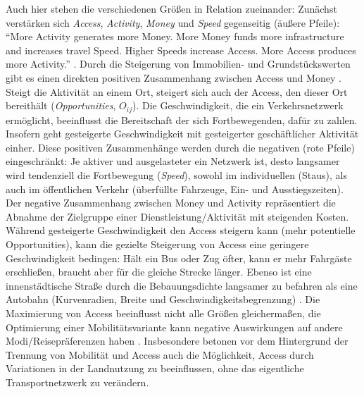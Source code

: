 \documentclass[11pt,pdftex,a4paper]{scrartcl}
\begin{document}
	Auch hier stehen die verschiedenen Größen in Relation zueinander: Zunächst verstärken sich \textit{Access}, \textit{Activity}, \textit{Money} und \textit{Speed} gegenseitig (äußere Pfeile): \enquote{More Activity generates more Money. More Money funds more infrastructure and increases travel Speed. Higher Speeds increase Access. More Access produces more Activity.} \parencite[18]{levinsonTransportAccessManual2020}. Durch die Steigerung von Immobilien- und Grundstückswerten gibt es einen direkten positiven Zusammenhang zwischen Access und Money \parencite[18]{levinsonTransportAccessManual2020}. Steigt die Aktivität an einem Ort, steigert sich auch der Access, den dieser Ort bereithält (\textit{Opportunities}, $O_{ij}$). Die Geschwindigkeit, die ein Verkehrsnetzwerk ermöglicht, beeinflusst die Bereitschaft der sich Fortbewegenden, dafür zu zahlen. Insofern geht gesteigerte Geschwindigkeit mit gesteigerter geschäftlicher Aktivität einher. Diese positiven Zusammenhänge werden durch die negativen (rote Pfeile) eingeschränkt: Je aktiver und ausgelasteter ein Netzwerk ist, desto langsamer wird tendenziell die Fortbewegung (\textit{Speed}), sowohl im individuellen (Staus), als auch im öffentlichen Verkehr (überfüllte Fahrzeuge, Ein- und Ausstiegszeiten). Der negative Zusammenhang zwischen Money und Activity repräsentiert die Abnahme der Zielgruppe einer Dienstleistung/Aktivität mit steigenden Kosten. Während gesteigerte Geschwindigkeit den Access steigern kann (mehr potentielle Opportunities), kann die gezielte Steigerung von Access eine geringere Geschwindigkeit bedingen: Hält ein Bus oder Zug öfter, kann er mehr Fahrgäste erschließen, braucht aber für die gleiche Strecke länger. Ebenso ist eine innenstädtische Straße durch die Bebauungsdichte langsamer zu befahren als eine Autobahn (Kurvenradien, Breite und Geschwindigkeitsbegrenzung) \parencite[19]{levinsonTransportAccessManual2020}. Die Maximierung von Access beeinflusst nicht alle Größen gleichermaßen, die Optimierung einer Mobilitätsvariante kann negative Auswirkungen auf andere Modi/Reisepräferenzen haben \parencite[vgl.][18f, 22, 25]{levinsonTransportAccessManual2020}. Insbesondere betonen \citeauthor{levinsonTransportAccessManual2020} vor dem Hintergrund der Trennung von Mobilität und Access auch die Möglichkeit, Access durch Variationen in der Landnutzung zu beeinflussen, ohne das eigentliche Transportnetzwerk zu verändern. 
	
\end{document}
